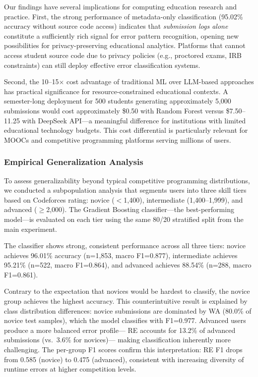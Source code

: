 \documentclass[10pt,a4paper]{article}
\begin{document}
Our findings have several implications for computing education
research and practice. First, the strong performance of metadata-only
classification (95.02\% accuracy without source code access) indicates that
\textit{submission logs alone} constitute a sufficiently rich signal for
error pattern recognition, opening new possibilities for privacy-preserving
educational analytics. Platforms that cannot access student source code
due to privacy policies (e.g., proctored exams, IRB constraints) can
still deploy effective error classification systems.

Second, the 10--15$\times$ cost advantage of traditional ML over LLM-based
approaches has practical significance for resource-constrained educational
contexts. A semester-long deployment for 500 students generating
approximately 5,000 submissions would cost approximately \$0.50 with Random
Forest versus \$7.50--11.25 with DeepSeek API---a meaningful difference
for institutions with limited educational technology budgets. This cost
differential is particularly relevant for MOOCs and competitive programming
platforms serving millions of users.

\subsubsection*{Empirical Generalization Analysis}
To assess generalizability beyond typical competitive programming
distributions, we conducted a subpopulation analysis that segments users into
three skill tiers based on Codeforces rating: novice ($<$1,400), intermediate
(1,400--1,999), and advanced ($\geq$2,000). The Gradient Boosting
classifier---the best-performing model---is evaluated on each tier using the
same 80/20 stratified split from the main experiment.

The classifier shows strong, consistent performance across all three tiers:
novice achieves 96.01\% accuracy (n=1,853, macro F1=0.877), intermediate
achieves 95.21\% (n=522, macro F1=0.864), and advanced achieves 88.54\%
(n=288, macro F1=0.861).

Contrary to the expectation that novices would be hardest to classify,
the novice group achieves the highest accuracy. This counterintuitive result
is explained by class distribution differences: novice submissions are
dominated by WA (80.0\% of novice test samples), which the model classifies
with F1=0.977. Advanced users produce a more balanced error profile---
RE accounts for 13.2\% of advanced submissions (vs.\ 3.6\% for novices)---
making classification inherently more challenging. The per-group F1 scores
confirm this interpretation: RE F1 drops from 0.585 (novice) to 0.475
(advanced), consistent with increasing diversity of runtime errors at higher
competition levels.
\end{document}
